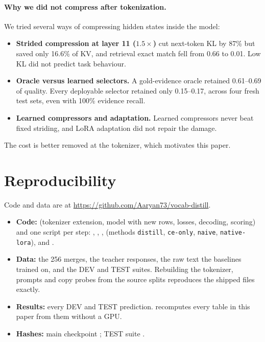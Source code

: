 \documentclass[11pt]{article}
\begin{document}
\paragraph{Why we did not compress after tokenization.} We tried several ways of compressing hidden states inside the model:
\begin{itemize}
  \item \textbf{Strided compression at layer 11 ($1.5\times$)} cut next-token KL by 87\% but saved only 16.6\% of KV, and retrieval exact match fell from 0.66 to 0.01. Low KL did not predict task behaviour.
  \item \textbf{Oracle versus learned selectors.} A gold-evidence oracle retained 0.61--0.69 of quality. Every deployable selector retained only 0.15--0.17, across four fresh test sets, even with 100\% evidence recall.
  \item \textbf{Learned compressors and adaptation.} Learned compressors never beat fixed striding, and LoRA adaptation did not repair the damage.
\end{itemize}
The cost is better removed at the tokenizer, which motivates this paper.

\section{Reproducibility}
Code and data are at \url{https://github.com/Aaryan73/vocab-distill}.
{\sloppy
\begin{itemize}
  \item \textbf{Code:}  (tokenizer extension, model with new rows, losses, decoding, scoring) and one script per step: , , ,  (methods \texttt{distill}, \texttt{ce-only}, \texttt{naive}, \texttt{native-lora}),  and .
  \item \textbf{Data:} the 256 merges, the teacher responses, the raw text the baselines trained on, and the DEV and TEST suites. Rebuilding the tokenizer, prompts and copy probes from the source splits reproduces the shipped files exactly.
  \item \textbf{Results:} every DEV and TEST prediction.  recomputes every table in this paper from them without a GPU.
  \item \textbf{Hashes:} main checkpoint ; TEST suite .
\end{itemize}
}
\end{document}
